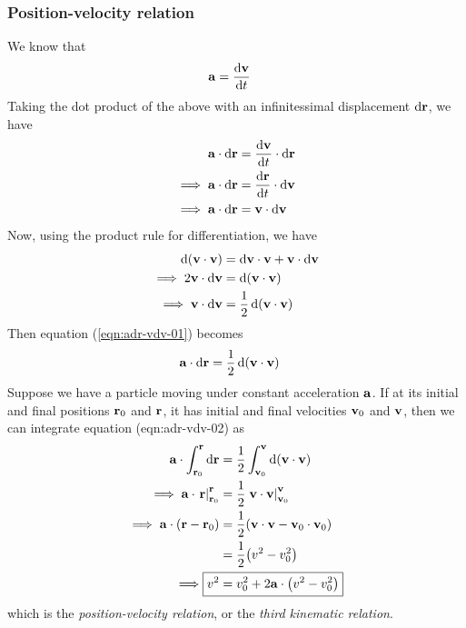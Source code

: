     	\subsubsection{Position-velocity relation}
    		We know that
    		\begin{align*}
    			\vb{a}&=\dv{\vb{v}}{t}
    		\end{align*}
    		Taking the dot product of the above with an infinitessimal displacement $\dd{\vb{r}}$, we have
    		\begin{align}
    			\vb{a}\cdot\dd{\vb{r}}&=\dv{\vb{v}}{t}\cdot\dd{\vb{r}} \nonumber\\
    			\implies\vb{a}\cdot\dd{\vb{r}}&=\dv{\vb{r}}{t}\cdot\dd{\vb{v}} \nonumber\\
    			\implies\vb{a}\cdot\dd{\vb{r}}&=\vb{v}\cdot\dd{\vb{v}} \label{eqn:adr-vdv-01}
    		\end{align}
    		Now, using the product rule for differentiation, we have
    		\begin{align*}
    			\dd{\qty(\vb{v}\cdot\vb{v})}&=\dd{\vb{v}}\cdot\vb{v}+\vb{v}\cdot\dd{\vb{v}} \\
    			\implies 2\vb{v}\cdot\dd{\vb{v}}&=\dd{\qty(\vb{v}\cdot\vb{v})} \\
    			\implies\vb{v}\cdot\dd{\vb{v}}&=\dfrac{1}{2}\dd{\qty(\vb{v}\cdot\vb{v})}
    		\end{align*}
    		Then equation (\ref{eqn:adr-vdv-01}) becomes
    		\begin{align}
    			\vb{a}\cdot\dd{\vb{r}}&=\dfrac{1}{2}\dd{\qty(\vb{v}\cdot\vb{v})} \label{eqn:adr-vdv-02}
    		\end{align}
    		Suppose we have a particle moving under constant acceleration $\vb{a}$. If at its initial and final positions $\vb{r}_0$ and $\vb{r}$, it has initial and final velocities $\vb{v}_0$ and $\vb{v}$, then we can integrate equation (eqn:adr-vdv-02) as
    		\begin{align}
    			\vb{a}\cdot\int_{\vb{r}_0}^{\vb{r}}{\dd{\vb{r}}}&=\dfrac{1}{2}\int_{\vb{v}_0}^{\vb{v}}{\dd{\qty(\vb{v}\cdot\vb{v})}} \nonumber\\
    			\implies\vb{a}\cdot\left. \vb{r} \right|_{\vb{r}_0}^{\vb{r}}&=\dfrac{1}{2}\left. \vb{v}\cdot\vb{v} \right|_{\vb{v}_0}^{\vb{v}} \nonumber\\
    			\implies\vb{a}\cdot\qty(\vb{r}-\vb{r}_0)&=\dfrac{1}{2}\qty(\vb{v}\cdot\vb{v}-\vb{v}_0\cdot\vb{v}_0) \nonumber\\
    				&=\dfrac{1}{2}\qty(v^2-v_0^2) \nonumber\\
    			\implies\Aboxed{v^2&=v_0^2+2\vb{a}\cdot\qty(v^2-v_0^2)} \label{eqn:kine-rel-03}
    		\end{align}
    		which is the \emph{position-velocity relation}, or the \emph{third kinematic relation}.
    
